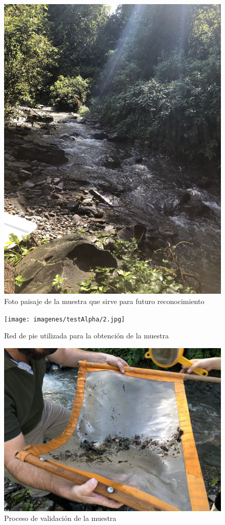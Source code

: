 		\begin{figure}[H]
			\centering
				\includegraphics[width=1\textwidth]{imagenes/testAlpha/1.jpg}
					\caption{Foto paisaje de la muestra que sirve para futuro reconocimiento}
		\end{figure}
		\begin{figure}[H]
			\centering
				\texttt{[image: imagenes/testAlpha/2.jpg]}
					\caption{Red de pie utilizada para la obtención de la muestra}
		\end{figure}
		\begin{figure}[H]
			\centering
				\includegraphics[width=1\textwidth]{imagenes/testAlpha/3.jpg}
					\caption{Proceso de validación de la muestra}
		\end{figure}

